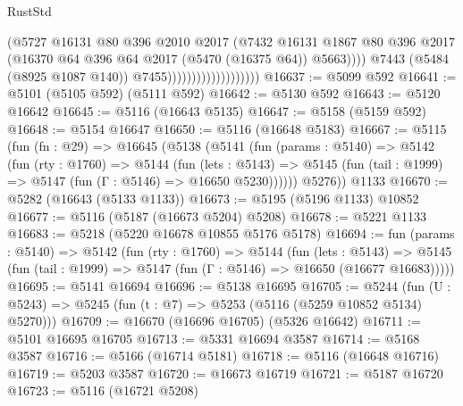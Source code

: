 \begin{lexlean}{RustStd}
\begin{coremodule}
                                            (@5727
                                              @16131
                                              @80
                                              @396
                                              @2010
                                              @2017
                                              (@7432
                                                @16131
                                                @1867
                                                @80
                                                @396
                                                @2017
                                                (@16370
                                                  @64
                                                  @396
                                                  @64
                                                  @2017
                                                  (@5470 (@16375 @64))
                                                  @5663))))
                                          @7443
                                          (@5484 (@8925 @1087 @140))
                                          @7455)))))))))))))))))))
@16637 := @5099 @592
@16641 := @5101 (@5105 @592) (@5111 @592)
@16642 := @5130 @592
@16643 := @5120 @16642
@16645 := @5116 (@16643 @5135)
@16647 := @5158 (@5159 @592)
@16648 := @5154 @16647
@16650 := @5116 (@16648 @5183)
@16667 := @5115
    (fun (fn : @29) =>
    @16645
      (@5138
        (@5141
          (fun (params : @5140) =>
          @5142
            (fun (rty : @1760) =>
            @5144
              (fun (lets : @5143) =>
              @5145 (fun (tail : @1999) => @5147 (fun (Γ : @5146) => @16650 @5230))))))
        @5276))
    @1133
@16670 := @5282 (@16643 (@5133 @1133))
@16673 := @5195 (@5196 @1133) @10852
@16677 := @5116 (@5187 (@16673 @5204) @5208)
@16678 := @5221 @1133
@16683 := @5218 (@5220 @16678 @10855 @5176 @5178)
@16694 := fun (params : @5140) =>
  @5142
    (fun (rty : @1760) =>
    @5144
      (fun (lets : @5143) =>
      @5145 (fun (tail : @1999) => @5147 (fun (Γ : @5146) => @16650 (@16677 @16683)))))
@16695 := @5141 @16694
@16696 := @5138 @16695
@16705 := @5244
    (fun (U : @5243) => @5245 (fun (t : @7) => @5253 (@5116 (@5259 @10852 @5134) @5270)))
@16709 := @16670 (@16696 @16705) (@5326 @16642)
@16711 := @5101 @16695 @16705
@16713 := @5331 @16694 @3587
@16714 := @5168 @3587
@16716 := @5166 (@16714 @5181)
@16718 := @5116 (@16648 @16716)
@16719 := @5203 @3587
@16720 := @16673 @16719
@16721 := @5187 @16720
@16723 := @5116 (@16721 @5208)

\end{coremodule}
\end{lexlean}
